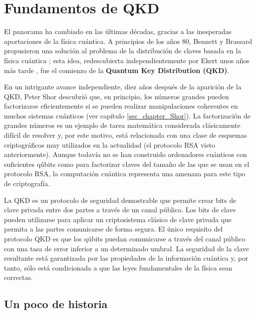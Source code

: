 \documentclass[a4paper,11pt]{book} %
\numberwithin{equation}{chapter}
\begin{document}
	\section{Fundamentos de QKD}


El panorama ha cambiado en las últimas décadas, gracias a las inesperadas aportaciones de la física cuántica. A principios de los años 80, Bennett y Brassard propusieron una solución al problema de la distribución de claves basada en la física cuántica \cite{bib_BB84}; esta idea, redescubierta independientemente por Ekert unos años más tarde \cite{bib_Ekert-1991}, fue el comienzo de la \textbf{Quantum Key Distribution (QKD)}.

En un intrigante avance independiente, diez años después de la aparición de la QKD, Peter Shor descubrió que, en principio, los números grandes pueden factorizarse eficientemente si se pueden realizar manipulaciones coherentes en muchos sistemas cuánticos (ver capítulo \ref{sec_chapter_Shor}). La factorización de grandes números es un ejemplo de tarea matemática considerada clásicamente difícil de resolver y, por este motivo, está relacionada con una clase de esquemas criptográficos muy utilizados en la actualidad (el protocolo RSA visto anteriormente). Aunque todavía no se han construido ordenadores cuánticos con suficientes qúbits como para factorizar claves del tamaño de las que se usan en el protocolo RSA, la computación cuántica representa una amenaza para este tipo de criptografía. 


	La QKD es un protocolo de seguridad demostrable que permite crear bits de clave privada entre dos partes a través de un canal público. Los bits de clave pueden utilizarse para aplicar un criptosistema clásico de clave privada que permita a las partes comunicarse de forma segura. El único requisito del protocolo QKD es que los qúbits puedan comunicarse a través del canal público con una tasa de error inferior a un determinado umbral. La seguridad de la clave resultante está garantizada por las propiedades de la información cuántica y, por tanto, sólo está condicionada a que las leyes fundamentales de la física sean correctas. 

		
		\subsection{Un poco de historia}
\end{document}
